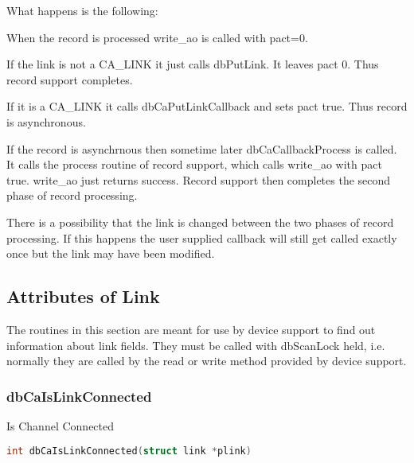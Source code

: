 What happens is the following:

\begin{description}

\item When the record is processed write\_ao is called with pact=0.

\begin{description}

\item If the link is not a CA\_LINK it just calls dbPutLink.
It leaves pact 0.
Thus record support completes.

\item If it is a CA\_LINK it calls dbCaPutLinkCallback and sets pact true.
Thus record is asynchronous.

\end{description}

\item If the record is asynchrnous then sometime later dbCaCallbackProcess is called.
It calls the process routine of record support, which calls write\_ao with pact true.
write\_ao just returns success.
Record support then completes the second phase of record processing.

\end{description}

There is a possibility that the link is changed between the two phases of record processing.
If this happens the user supplied callback will still get called exactly once but the link may have been modified.

\subsection{Attributes of Link}

The routines in this section are meant for use by device support to find out information about link fields.
They must be called with dbScanLock held, i.e. normally they are called by the read or write method provided by device support.

\subsubsection{dbCaIsLinkConnected}

Is Channel Connected

\begin{lstlisting}[language=C]
int dbCaIsLinkConnected(struct link *plink)
\end{lstlisting}

